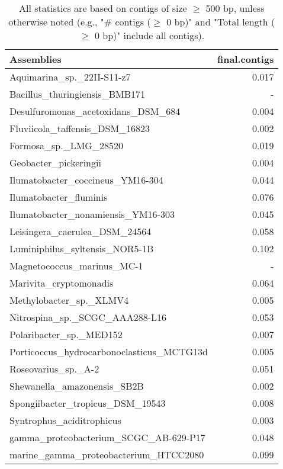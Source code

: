 \documentclass[12pt,a4paper]{article}
\begin{document}
\begin{table}[ht]
\begin{center}
\caption{All statistics are based on contigs of size $\geq$ 500 bp, unless otherwise noted (e.g., "\# contigs ($\geq$ 0 bp)" and "Total length ($\geq$ 0 bp)" include all contigs).}
\begin{tabular}{|l*{1}{|r}|}
\hline
Assemblies & final.contigs \\ \hline
Aquimarina\_sp.\_22II-S11-z7 & 0.017 \\ \hline
Bacillus\_thuringiensis\_BMB171 & - \\ \hline
Desulfuromonas\_acetoxidans\_DSM\_684 & 0.004 \\ \hline
Fluviicola\_taffensis\_DSM\_16823 & 0.002 \\ \hline
Formosa\_sp.\_LMG\_28520 & 0.019 \\ \hline
Geobacter\_pickeringii & 0.004 \\ \hline
Ilumatobacter\_coccineus\_YM16-304 & 0.044 \\ \hline
Ilumatobacter\_fluminis & 0.076 \\ \hline
Ilumatobacter\_nonamiensis\_YM16-303 & 0.045 \\ \hline
Leisingera\_caerulea\_DSM\_24564 & 0.058 \\ \hline
Luminiphilus\_syltensis\_NOR5-1B & 0.102 \\ \hline
Magnetococcus\_marinus\_MC-1 & - \\ \hline
Marivita\_cryptomonadis & 0.064 \\ \hline
Methylobacter\_sp.\_XLMV4 & 0.005 \\ \hline
Nitrospina\_sp.\_SCGC\_AAA288-L16 & 0.053 \\ \hline
Polaribacter\_sp.\_MED152 & 0.007 \\ \hline
Porticoccus\_hydrocarbonoclasticus\_MCTG13d & 0.005 \\ \hline
Roseovarius\_sp.\_A-2 & 0.051 \\ \hline
Shewanella\_amazonensis\_SB2B & 0.002 \\ \hline
Spongiibacter\_tropicus\_DSM\_19543 & 0.008 \\ \hline
Syntrophus\_aciditrophicus & 0.003 \\ \hline
gamma\_proteobacterium\_SCGC\_AB-629-P17 & 0.048 \\ \hline
marine\_gamma\_proteobacterium\_HTCC2080 & 0.099 \\ \hline
\end{tabular}
\end{center}
\end{table}
\end{document}
